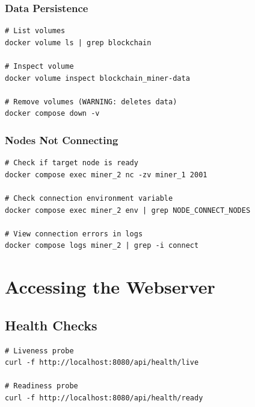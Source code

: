 \subsubsection{Data Persistence}

\begin{listing}[H]
\caption{Check Data Persistence}
\label{lst:ch22-data-check}
\begin{verbatim}
# List volumes
docker volume ls | grep blockchain

# Inspect volume
docker volume inspect blockchain_miner-data

# Remove volumes (WARNING: deletes data)
docker compose down -v
\end{verbatim}
\end{listing}

\subsubsection{Nodes Not Connecting}

\begin{listing}[H]
\caption{Troubleshoot Node Connectivity}
\label{lst:ch22-connectivity}
\begin{verbatim}
# Check if target node is ready
docker compose exec miner_2 nc -zv miner_1 2001

# Check connection environment variable
docker compose exec miner_2 env | grep NODE_CONNECT_NODES

# View connection errors in logs
docker compose logs miner_2 | grep -i connect
\end{verbatim}
\end{listing}

\section{Accessing the Webserver}
\label{sec:docker-webserver-access}

\subsection{Health Checks}

\begin{listing}[H]
\caption{Webserver Health Endpoints}
\label{lst:ch22-health}
\begin{verbatim}
# Liveness probe
curl -f http://localhost:8080/api/health/live

# Readiness probe
curl -f http://localhost:8080/api/health/ready
\end{verbatim}
\end{listing}

